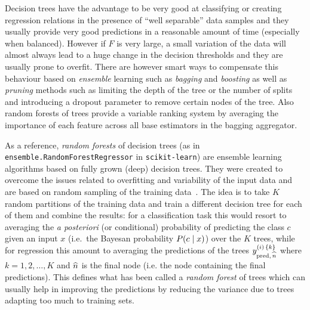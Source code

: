 Decision trees have the advantage to be very good at classifying or creating regression relations in the presence of ``well separable'' data samples and they usually provide very good predictions in a reasonable amount of time (especially when balanced).
However if $F$ is very large, a small variation of the data will almost always lead to a huge change in the decision thresholds and they are usually prone to overfit.
There are however smart ways to compensate this behaviour based on \textit{ensemble} learning such as \textit{bagging} and \textit{boosting} as well as \textit{pruning} methods such as limiting the depth of the tree or the number of splits and introducing a dropout parameter to remove certain nodes of the tree.\footnotemark{}
Also random forests of trees provide a variable ranking system by averaging the importance of each feature across all base estimators in the bagging aggregator.

As a reference, \textit{random forests} of decision trees (as in \texttt{ensemble.RandomForestRegressor} in \texttt{scikit-learn}) are ensemble learning algorithms based on fully grown (deep) decision trees.
They were created to overcome the issues related to overfitting and variability of the input data and are based on random sampling of the training data~\cite{Ho:1995:RandomDecisionForests}.
The idea is to take $K$ random partitions of the training data and train a different decision tree for each of them and combine the results: for a classification task this would resort to averaging the \textit{a posteriori} (or conditional) probability of predicting the class $c$ given an input $x$ (i.e.\ the Bayesan probability $P\qty(c \mid x)$) over the $K$ trees, while for regression this amount to averaging the predictions of the trees $y_{\text{pred},\, \widehat{n}}^{(i)\, \lbrace k \rbrace}$ where $k = 1, 2, \dots, K$ and $\widehat{n}$ is the final node (i.e. the node containing the final predictions).
This defines what has been called a \textit{random forest} of trees which can usually help in improving the predictions by reducing the variance due to trees adapting too much to training sets.

